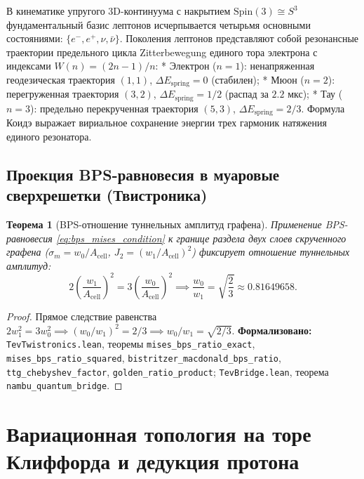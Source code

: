 \documentclass[11pt,a4paper]{article}
\newtheorem{theorem}{Теорема}
\theoremstyle{definition}
\theoremstyle{remark}
\begin{document}
В кинематике упругого 3D-континуума с накрытием $\mathrm{Spin}(3) \cong S^3$ фундаментальный базис лептонов исчерпывается четырьмя основными состояниями: $\{e^-, e^+, \nu, \bar{\nu}\}$. Поколения лептонов представляют собой резонансные траектории предельного цикла Zitterbewegung единого тора электрона с индексами $W(n) = (2n-1)/n$:
* Электрон ($n=1$): ненапряженная геодезическая траектория $(1,1)$, $\Delta E_{\mathrm{spring}} = 0$ (стабилен);
* Мюон ($n=2$): перегруженная траектория $(3,2)$, $\Delta E_{\mathrm{spring}} = 1/2$ (распад за $2.2\text{ мкс}$);
* Тау ($n=3$): предельно перекрученная траектория $(5,3)$, $\Delta E_{\mathrm{spring}} = 2/3$.
Формула Коидэ выражает вириальное сохранение энергии трех гармоник натяжения единого резонатора.

\subsection{Проекция BPS-равновесия в муаровые сверхрешетки (Твистроника)}

\begin{theorem}[BPS-отношение туннельных амплитуд графена]
\label{thm:twistronics_bps_ratio}
Применение BPS-равновесия \eqref{eq:bps_mises_condition} к границе раздела двух слоев скрученного графена ($\sigma_m = w_0/A_{\mathrm{cell}}$, $J_2 = (w_1/A_{\mathrm{cell}})^2$)  фиксирует отношение туннельных амплитуд:
\begin{equation}
    2 \left(\frac{w_1}{A_{\mathrm{cell}}}\right)^2 = 3 \left(\frac{w_0}{A_{\mathrm{cell}}}\right)^2 \implies \frac{w_0}{w_1} = \sqrt{\frac{2}{3}} \approx 0.81649658.
    \label{eq:twist_bps_ratio_exact}
\end{equation}
\end{theorem}
\begin{proof}
Прямое следствие равенства $2 w_1^2 = 3 w_0^2 \implies (w_0/w_1)^2 = 2/3 \implies w_0/w_1 = \sqrt{2/3}$.
\noindent\small\textbf{Формализовано:} \texttt{TevTwistronics.lean}, теоремы \texttt{mises_bps_ratio_exact}, \texttt{mises_bps_ratio_squared}, \texttt{bistritzer_macdonald_bps_ratio}, \texttt{ttg\_chebyshev\_factor}, \texttt{golden\_ratio\_product}; \texttt{TevBridge.lean}, теорема \texttt{nambu_quantum_bridge}.
\end{proof}

\section{Вариационная топология на торе Клиффорда и дедукция протона}
\end{document}
